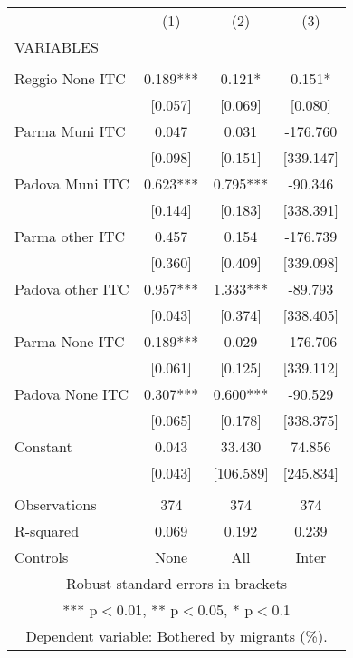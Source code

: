 \begin{tabular}{lccc} \hline
 & (1) & (2) & (3) \\
VARIABLES &  &  &  \\ \hline
 &  &  &  \\
Reggio None ITC & 0.189*** & 0.121* & 0.151* \\
 & [0.057] & [0.069] & [0.080] \\
Parma Muni ITC & 0.047 & 0.031 & -176.760 \\
 & [0.098] & [0.151] & [339.147] \\
Padova Muni ITC & 0.623*** & 0.795*** & -90.346 \\
 & [0.144] & [0.183] & [338.391] \\
Parma other ITC & 0.457 & 0.154 & -176.739 \\
 & [0.360] & [0.409] & [339.098] \\
Padova other ITC & 0.957*** & 1.333*** & -89.793 \\
 & [0.043] & [0.374] & [338.405] \\
Parma None ITC & 0.189*** & 0.029 & -176.706 \\
 & [0.061] & [0.125] & [339.112] \\
Padova None ITC & 0.307*** & 0.600*** & -90.529 \\
 & [0.065] & [0.178] & [338.375] \\
Constant & 0.043 & 33.430 & 74.856 \\
 & [0.043] & [106.589] & [245.834] \\
 &  &  &  \\
Observations & 374 & 374 & 374 \\
R-squared & 0.069 & 0.192 & 0.239 \\
 Controls & None & All & Inter \\ \hline
\multicolumn{4}{c}{ Robust standard errors in brackets} \\
\multicolumn{4}{c}{ *** p$<$0.01, ** p$<$0.05, * p$<$0.1} \\
\multicolumn{4}{c}{ Dependent variable: Bothered by migrants (\%).} \\
\end{tabular}
